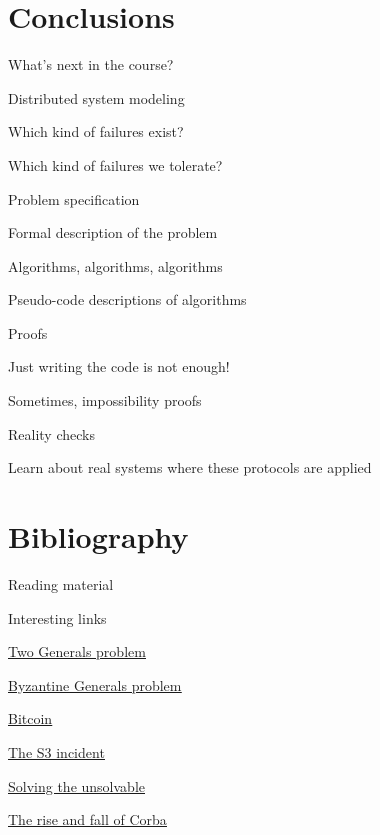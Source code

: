 \section{Conclusions}

\begin{frame}{What's next in the course?}
\BI
\item Distributed system modeling
\BI
\item Which kind of failures exist? 
\item Which kind of failures we tolerate?
\EI
\bigskip
\item Problem specification
\BI
\item Formal description of the problem
\item Algorithms, algorithms, algorithms
\item Pseudo-code descriptions of algorithms
\EI
\bigskip
\item Proofs
\BI
\item Just writing the code is not enough!
\item Sometimes, impossibility proofs
\EI
\bigskip
\item Reality checks
\BI
\item Learn about real systems where these protocols are applied
\EI
\EI
\end{frame}


\section{Bibliography}

\begin{frame}{Reading material}

{\footnotesize

  
}

\end{frame}


\begin{frame}{Interesting links}

{\footnotesize
\BI
\item \href{http://en.wikipedia.org/wiki/Two_Generals'_Problem}{\underline{Two Generals problem}}
\item \href{http://en.wikipedia.org/wiki/Byzantine_Generals'_Problem}{\underline{Byzantine Generals problem}}
\item \href{http://en.wikipedia.org/wiki/Bitcoin}{\underline{Bitcoin}}
\item \href{http://status.aws.amazon.com/s3-20080720.html}{\underline{The S3 incident}}
\item \href{http://cacm.acm.org/magazines/2011/7/109895-solving-the-unsolvable/fulltext}{\underline{Solving the unsolvable}}
\item \href{http://queue.acm.org/detail.cfm?id=1142044}{\underline{The rise and fall of Corba}}
\EI
}

\end{frame}



 


